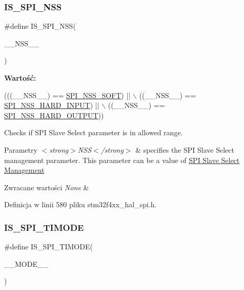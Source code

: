 \subsubsection{\texorpdfstring{I\+S\+\_\+\+S\+P\+I\+\_\+\+N\+SS}{IS\_SPI\_NSS}}
{\footnotesize\ttfamily \#define I\+S\+\_\+\+S\+P\+I\+\_\+\+N\+SS(\begin{DoxyParamCaption}\item[{}]{\+\_\+\+\_\+\+N\+S\+S\+\_\+\+\_\+ }\end{DoxyParamCaption})}

{\bfseries Wartość\+:}
\begin{DoxyCode}
(((\_\_NSS\_\_) == \hyperlink{group___s_p_i___slave___select__management_ga0bf14691b9d03eb158f190cefa7ab8fc}{SPI\_NSS\_SOFT})       || \(\backslash\)
                             ((\_\_NSS\_\_) == \hyperlink{group___s_p_i___slave___select__management_ga62c42a5e28ce3b0dc92c5186c10accf8}{SPI\_NSS\_HARD\_INPUT}) || \(\backslash\)
                             ((\_\_NSS\_\_) == \hyperlink{group___s_p_i___slave___select__management_gab7f2da432661406a37fa2afe4efacd87}{SPI\_NSS\_HARD\_OUTPUT}))
\end{DoxyCode}


Checks if S\+PI Slave Select parameter is in allowed range. 


\begin{DoxyParams}{Parametry}
{\em $<$strong$>$\+N\+S\+S$<$/strong$>$} & specifies the S\+PI Slave Select management parameter. This parameter can be a value of \hyperlink{group___s_p_i___slave___select__management}{S\+PI Slave Select Management} \\
\hline
\end{DoxyParams}

\begin{DoxyRetVals}{Zwracane wartości}
{\em None} & \\
\hline
\end{DoxyRetVals}


Definicja w linii 580 pliku stm32f4xx\+\_\+hal\+\_\+spi.\+h.

\mbox{\label{group___s_p_i___private___macros_ga8e3c348af57cf973277018958fccfed9}} 
\subsubsection{\texorpdfstring{I\+S\+\_\+\+S\+P\+I\+\_\+\+T\+I\+M\+O\+DE}{IS\_SPI\_TIMODE}}
{\footnotesize\ttfamily \#define I\+S\+\_\+\+S\+P\+I\+\_\+\+T\+I\+M\+O\+DE(\begin{DoxyParamCaption}\item[{}]{\+\_\+\+\_\+\+M\+O\+D\+E\+\_\+\+\_\+ }\end{DoxyParamCaption})}

